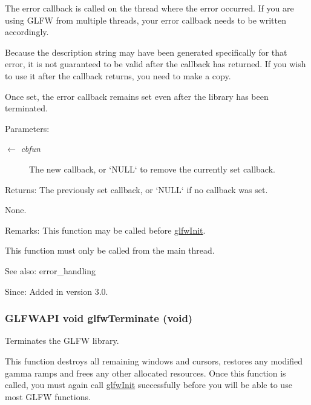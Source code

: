 The error callback is called on the thread where the error occurred. If you are using GLFW from multiple threads, your error callback needs to be written accordingly.

Because the description string may have been generated specifically for that error, it is not guaranteed to be valid after the callback has returned. If you wish to use it after the callback returns, you need to make a copy.

Once set, the error callback remains set even after the library has been terminated.

\begin{Desc}
\item[Parameters:]
\begin{description}
\item[\mbox{$\leftarrow$} {\em cbfun}]The new callback, or `NULL` to remove the currently set callback. \end{description}
\end{Desc}
\begin{Desc}
\item[Returns:]The previously set callback, or `NULL` if no callback was set.\end{Desc}
None.

\begin{Desc}
\item[Remarks:]This function may be called before \hyperlink{group__init_gb41771f0215a2e0afb4cf1cf98082d40}{glfwInit}.\end{Desc}
This function must only be called from the main thread.

\begin{Desc}
\item[See also:]error\_\-handling\end{Desc}
\begin{Desc}
\item[Since:]Added in version 3.0. \end{Desc}
\hypertarget{group__init_gfd90e6fd4819ea9e22e5e739519a6504}{
\subsubsection[glfwTerminate]{\setlength{\rightskip}{0pt plus 5cm}GLFWAPI void glfwTerminate (void)}}
\label{group__init_gfd90e6fd4819ea9e22e5e739519a6504}


Terminates the GLFW library. 

This function destroys all remaining windows and cursors, restores any modified gamma ramps and frees any other allocated resources. Once this function is called, you must again call \hyperlink{group__init_gb41771f0215a2e0afb4cf1cf98082d40}{glfwInit} successfully before you will be able to use most GLFW functions.

